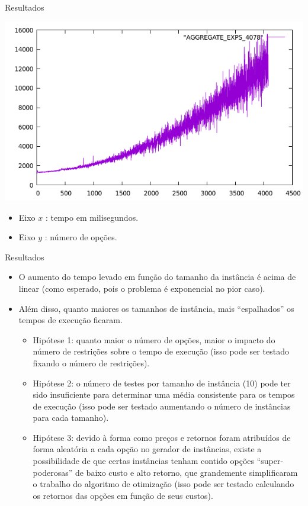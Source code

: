 \documentclass{beamer}
\begin{document}
\begin{frame}{Resultados}
\begin{center}
\includegraphics[scale=0.3]{GRAPH_FOR_PRESENTATION.png}
\end{center}
\begin{itemize}
\item Eixo $x$ : tempo em milisegundos.
\item Eixo $y$ : número de opções.
\end{itemize}
\end{frame}

\begin{frame}{Resultados}
\begin{itemize}
\item O aumento do tempo levado em função do tamanho da instância é acima de linear (como esperado, pois o problema é exponencial no pior caso).\pause
\item Além disso, quanto maiores os tamanhos de instância, mais ``espalhados'' os tempos de execução ficaram.\pause
\begin{itemize}
\item Hipótese 1: quanto maior o número de opções, maior o impacto do número de restrições sobre o tempo de execução (isso pode ser testado fixando o número de restrições).\pause
\item Hipótese 2: o número de testes por tamanho de instância (10) pode ter sido insuficiente para determinar uma média consistente para os tempos de execução 
(isso pode ser testado aumentando o número de instâncias para cada tamanho).\pause
\item Hipótese 3: devido à forma como preços e retornos foram atribuídos de forma aleatória a cada opção no gerador de instâncias, existe a possibilidade de que certas instâncias tenham contido
opções ``super-poderosas'' de baixo custo e alto retorno, que grandemente simplificaram o trabalho do algoritmo de otimização (isso pode ser testado calculando os retornos das opções em função de seus custos).
\end{itemize}
\end{itemize}
\end{frame}
\end{document}
